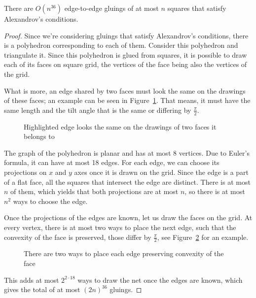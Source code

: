 \documentclass[a4paper,11pt]{article}
\begin{document}
\begin{theorem} \label{thm:n36}
	There are $O \left( n^{36} \right)$ edge-to-edge gluings of at most $n$ squares that satisfy Alexandrov's conditions.
\end{theorem}

\begin{proof}
Since we're considering gluings that satisfy Alexandrov's conditions, there is a polyhedron corresponding to each of them. Consider this polyhedron and triangulate it. Since this polyhedron is glued from squares, it is possible to draw each of its faces on square grid, the vertices of the face being also the vertices of the grid.

What is more, an edge shared by two faces must look the same on the drawings of these faces; an example can be seen in Figure~\ref{fig:edgesMeeting}. That means, it must have the same length and the tilt angle that is the same or differing by $\frac{\pi}{2}$. 

\begin{figure}[h] \centering
{}\hspace{1.2cm}
\caption{Highlighted edge looks the same on the drawings of two faces it belongs to}
\label{fig:edgesMeeting}
\end{figure}

The graph of the polyhedron is planar and has at most 8 vertices. Due to Euler's formula, it can have at most 18 edges. For each edge, we can choose its projections on $x$ and $y$ axes once it is drawn on the grid. Since the edge is a part of a flat face, all the squares that intersect the edge are distinct. There is at most $n$ of them, which yields that both projections are at most $n$, so there is at most $n^2$ ways to choose the edge.

Once the projections of the edges are known, let us draw the faces on the grid. At every vertex, there is at most two ways to place the next edge, such that the convexity of the face is preserved, those differ by $\frac{\pi}{2}$, see Figure~\ref{fig:twoWays} for an example.

\begin{figure}[h] \centering
{}
\caption{There are two ways to place each edge preserving convexity of the face}
\label{fig:twoWays}
\end{figure}

This adds at most $2^{2 \cdot 18}$ ways to draw the net once the edges are known, which gives the total of at most $(2n)^{36}$ gluings.
\end{proof}
\end{document}
